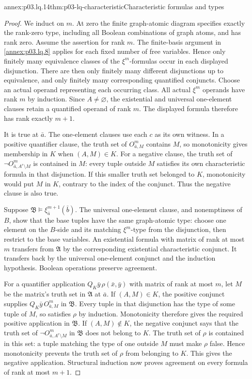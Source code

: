 \begin{annexitem}{annex:p03.lq.14}{thm:p03-lq-characteristic}{Characteristic formulas and types}
\begin{proof}
We induct on \(m\). At zero the finite graph-atomic diagram
specifies exactly the rank-zero type, including all Boolean
combinations of graph atoms, and has rank zero.
Assume the assertion for rank \(m\). The finite-basis argument
in \cref{annex:p03.lq.8} applies for each fixed number of free
variables. Hence only finitely many equivalence classes of the
\(\xi^m\)-formulas occur in each displayed disjunction. There
are then only finitely many different disjunctions up to equivalence,
and only finitely many corresponding quantified conjuncts.
Choose an actual operand representing each occurring class.
All actual \(\xi^m\) operands have rank \(m\) by induction.
Since \(A\ne\varnothing\), the existential and universal
one-element clauses retain a quantified operand of rank \(m\).
The displayed formula therefore has rank exactly \(m+1\).

It is true at \(\bar a\). The one-element clauses use each
\(c\) as its own witness. In a positive quantifier clause,
the truth set of \(O^m_{\bar a,M}\) contains \(M\), so
monotonicity gives membership in \(K\) when \((A,M)\in K\).
For a negative clause, the truth set of
\(\neg O^m_{\bar a,A^r\setminus M}\) is contained in \(M\):
every tuple outside \(M\) satisfies its own characteristic
formula in that disjunction. If this smaller truth set belonged
to \(K\), monotonicity would put \(M\) in \(K\), contrary to
the index of the conjunct. Thus the negative clause is also true.

Suppose \(\mathfrak B\models\xi^{m+1}_{\bar a}(\bar b)\).
The universal one-element clause, and nonemptiness of \(B\),
show that the base tuples have the same graph-atomic type: choose
one element on the \(B\)-side and its matching \(\xi^m\)-type
from the disjunction, then restrict to the base variables.
An existential formula with matrix of rank at most \(m\)
transfers from \(\mathfrak A\) by the corresponding existential
characteristic conjunct. It transfers back by the universal
one-element conjunct and the induction hypothesis. Boolean
operations preserve agreement.

For a quantifier application \(Q_K\bar y\,\rho(\bar x,\bar y)\)
with matrix of rank at most \(m\), let \(M\) be the matrix's
truth set in \(\mathfrak A\) at \(\bar a\).
If \((A,M)\in K\), the positive conjunct supplies
\(Q_K\bar y\,O^m_{\bar a,M}\) in \(\mathfrak B\).
Every tuple in that disjunction has the type of some tuple of
\(M\), so satisfies \(\rho\) by induction. Monotonicity
therefore gives the required positive application in \(\mathfrak B\).
If \((A,M)\notin K\), the negative conjunct says that the
truth set of \(\neg O^m_{\bar a,A^r\setminus M}\) in
\(\mathfrak B\) does not belong to \(K\).
The truth set of \(\rho\) is contained in this set: a tuple
matching the type of one outside \(M\) must make \(\rho\)
false. Hence monotonicity prevents the truth set of \(\rho\)
from belonging to \(K\). This gives the negative application.
Structural induction now proves agreement on every formula of
rank at most \(m+1\).


\end{proof}
\end{annexitem}
